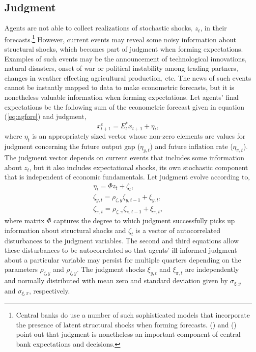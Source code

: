 \documentclass[12pt]{article}
\newcommand{\beq}{\begin{equation}}
\newcommand{\eeq}{\end{equation}}
\newcommand{\citee}[1]{\citename{#1} (\citeyear{#1})}
\newcommand{\ds}{\displaystyle}
\begin{document}
\subsection{Judgment}
Agents are not able to collect realizations of stochastic shocks, $z_t$, in their forecasts.\footnote{Central banks do use a number of such sophisticated models that incorporate the presence of latent structural shocks when forming forecasts.  \citee{rsw1997} and \citee{svensson2005} point out that judgment is nonetheless an important component of central bank expectations and decisions.}  However, current events may reveal some noisy information about structural shocks, which becomes part of judgment when forming expectations.  Examples of such events may be the announcement of technological innovations, natural disasters, onset of war or political instability among trading partners, changes in weather effecting agricultural production, etc.  The news of such events cannot be instantly mapped to data to make econometric forecasts, but it is nonetheless valuable information when forming expectations.  Let agents' final expectations be the following sum of the econometric forecast given in equation (\ref{eq:agfore}) and judgment,
\beq x_{t+1}^e = E_t^* x_{t+1} + \eta_{t}, \eeq
where $\eta_t$ is an appropriately sized vector whose non-zero elements are values for judgment concerning the future output gap ($\eta_{y,t}$) and future inflation rate ($\eta_{\pi,t}$).  The judgment vector depends on current events that includes some information about $z_t$, but it also includes expectational shocks, its own stochastic component that is independent of economic fundamentals.  Let judgment evolve according to,
\beq \label{eq:news} \begin{array}{c} \ds \eta_t = \Phi z_t + \zeta_t, \\ [1pc]
 \ds \zeta_{y,t} = \rho_{\zeta,y} \zeta_{y,t-1} + \xi_{y,t}, \\ [1pc]
 \ds \zeta_{\pi,t} = \rho_{\zeta,\pi} \zeta_{\pi,t-1} + \xi_{\pi,t},
\end{array} \eeq
where matrix $\Phi$ captures the degree to which judgment successfully picks up information about structural shocks and $\zeta_t$ is a vector of autocorrelated disturbances to the judgment variables.  The second and third equations allow these disturbances to be autocorrelated so that agents' ill-informed judgment about a particular variable may persist for multiple quarters depending on the parameters $\rho_{\zeta,y}$ and $\rho_{\zeta,y}$.  The judgment shocks $\xi_{y,t}$ and $\xi_{\pi,t}$ are independently and normally distributed with mean zero and standard deviation given by $\sigma_{\xi,y}$ and $\sigma_{\xi,\pi}$, respectively.  
\end{document}
